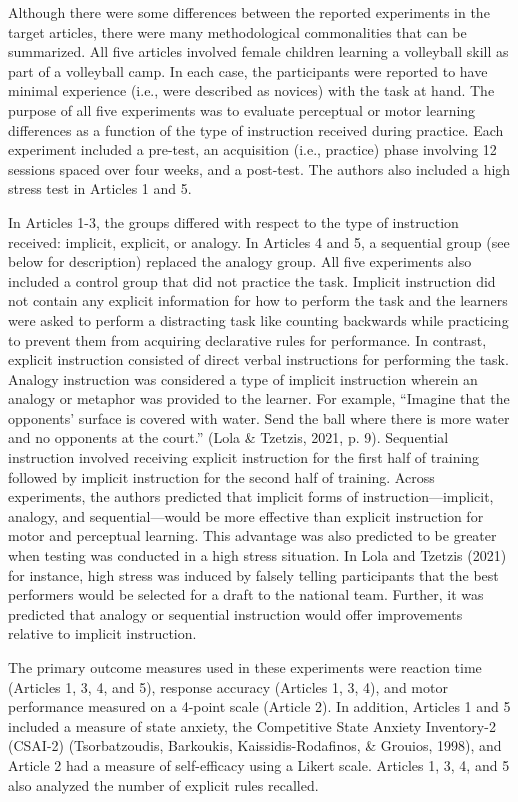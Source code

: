 \documentclass[
  english,
  man,floatsintext]{apa7}
\begin{document}
Although there were some differences between the reported experiments in the target articles, there were many methodological commonalities that can be summarized. All five articles involved female children learning a volleyball skill as part of a volleyball camp. In each case, the participants were reported to have minimal experience (i.e., were described as novices) with the task at hand. The purpose of all five experiments was to evaluate perceptual or motor learning differences as a function of the type of instruction received during practice. Each experiment included a pre-test, an acquisition (i.e., practice) phase involving 12 sessions spaced over four weeks, and a post-test. The authors also included a high stress test in Articles 1 and 5.

In Articles 1-3, the groups differed with respect to the type of instruction received: implicit, explicit, or analogy. In Articles 4 and 5, a sequential group (see below for description) replaced the analogy group. All five experiments also included a control group that did not practice the task. Implicit instruction did not contain any explicit information for how to perform the task and the learners were asked to perform a distracting task like counting backwards while practicing to prevent them from acquiring declarative rules for performance. In contrast, explicit instruction consisted of direct verbal instructions for performing the task. Analogy instruction was considered a type of implicit instruction wherein an analogy or metaphor was provided to the learner. For example, ``Imagine that the opponents' surface is covered with water. Send the ball where there is more water and no opponents at the court.'' (Lola \& Tzetzis, 2021, p. 9). Sequential instruction involved receiving explicit instruction for the first half of training followed by implicit instruction for the second half of training. Across experiments, the authors predicted that implicit forms of instruction---implicit, analogy, and sequential---would be more effective than explicit instruction for motor and perceptual learning. This advantage was also predicted to be greater when testing was conducted in a high stress situation. In Lola and Tzetzis (2021) for instance, high stress was induced by falsely telling participants that the best performers would be selected for a draft to the national team. Further, it was predicted that analogy or sequential instruction would offer improvements relative to implicit instruction.

The primary outcome measures used in these experiments were reaction time (Articles 1, 3, 4, and 5), response accuracy (Articles 1, 3, 4), and motor performance measured on a 4-point scale (Article 2). In addition, Articles 1 and 5 included a measure of state anxiety, the Competitive State Anxiety Inventory-2 (CSAI-2) (Tsorbatzoudis, Barkoukis, Kaissidis-Rodafinos, \& Grouios, 1998), and Article 2 had a measure of self-efficacy using a Likert scale. Articles 1, 3, 4, and 5 also analyzed the number of explicit rules recalled.
\end{document}
